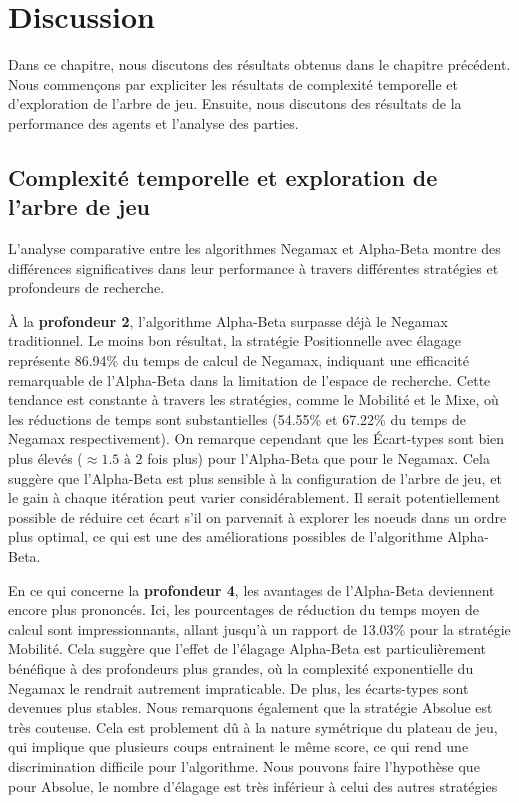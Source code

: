 \chapter{Discussion}
\label{chap:discussion}

Dans ce chapitre, nous discutons des résultats obtenus dans le chapitre précédent. Nous commençons par expliciter les résultats de complexité temporelle et d'exploration de l'arbre de jeu. Ensuite, nous discutons des résultats de la performance des agents et l'analyse des parties.

\section{Complexité temporelle et exploration de l'arbre de jeu}
L'analyse comparative entre les algorithmes Negamax et Alpha-Beta montre des différences significatives dans leur performance à travers différentes stratégies et profondeurs de recherche.

À la \textbf{profondeur 2}, l'algorithme Alpha-Beta surpasse déjà le Negamax traditionnel. Le moins bon résultat, la  stratégie Positionnelle avec élagage représente 86.94\% du temps de calcul de Negamax, indiquant une efficacité remarquable de l'Alpha-Beta dans la limitation de l'espace de recherche. Cette tendance est constante à travers les stratégies, comme le Mobilité et le Mixe, où les réductions de temps sont substantielles (54.55\% et 67.22\% du temps de Negamax respectivement). On remarque cependant que les Écart-types sont bien plus élevés ($\approx 1.5 \,\, \text{à} \,\, 2$ fois plus) pour l'Alpha-Beta que pour le Negamax. Cela suggère que l'Alpha-Beta est plus sensible à la configuration de l'arbre de jeu, et le gain à chaque itération peut varier considérablement. Il serait potentiellement possible de réduire cet écart s'il on parvenait à explorer les noeuds dans un ordre plus optimal, ce qui est une des améliorations possibles de l'algorithme Alpha-Beta.

En ce qui concerne la \textbf{profondeur 4}, les avantages de l'Alpha-Beta deviennent encore plus prononcés. Ici, les pourcentages de réduction du temps moyen de calcul sont impressionnants, allant jusqu'à un rapport de 13.03\% pour la stratégie Mobilité. Cela suggère que l'effet de l'élagage Alpha-Beta est particulièrement bénéfique à des profondeurs plus grandes, où la complexité exponentielle du Negamax le rendrait autrement impraticable. De plus, les écarts-types sont devenues plus stables. Nous remarquons également que la stratégie Absolue est très couteuse. Cela est problement dû à la nature symétrique du plateau de jeu, qui implique que plusieurs coups entrainent le même score, ce qui rend une discrimination difficile pour l'algorithme. Nous pouvons faire l'hypothèse que pour Absolue, le nombre d'élagage est très inférieur à celui des autres stratégies

